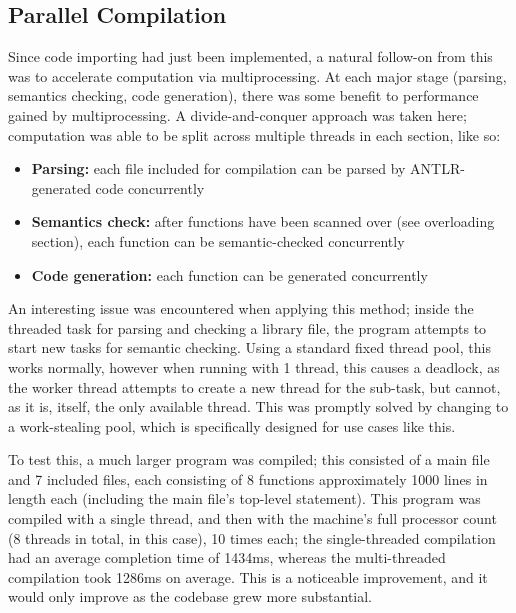 \documentclass{article}
\begin{document}
\subsection{Parallel Compilation}\label{parallel}
Since code importing had just been implemented, a natural follow-on from this was to accelerate computation via multiprocessing. At each major stage (parsing, semantics checking, code generation), there was some benefit to performance gained by multiprocessing. A divide-and-conquer approach was taken here; computation was able to be split across multiple threads in each section, like so:
\begin{itemize}
    \item \textbf{Parsing:} each file included for compilation can be parsed by ANTLR-generated code concurrently
    \item \textbf{Semantics check:} after functions have been scanned over (see overloading section), each function can be semantic-checked concurrently
    \item \textbf{Code generation:} each function can be generated concurrently
\end{itemize} 

An interesting issue was encountered when applying this method; inside the threaded task for parsing and checking a library file, the program attempts to start new tasks for semantic checking. Using a standard fixed thread pool, this works normally, however when running with 1 thread, this causes a deadlock, as the worker thread attempts to create a new thread for the sub-task, but cannot, as it is, itself, the only available thread. This was promptly solved by changing to a work-stealing pool, which is specifically designed for use cases like this.

To test this, a much larger program was compiled; this consisted of a main file and 7 included files, each consisting of 8 functions approximately 1000 lines in length each (including the main file's top-level statement). This program was compiled with a single thread, and then with the machine's full processor count (8 threads in total, in this case), 10 times each; the single-threaded compilation had an average completion time of 1434ms, whereas the multi-threaded compilation took 1286ms on average. This is a noticeable improvement, and it would only improve as the codebase grew more substantial.
\end{document}
